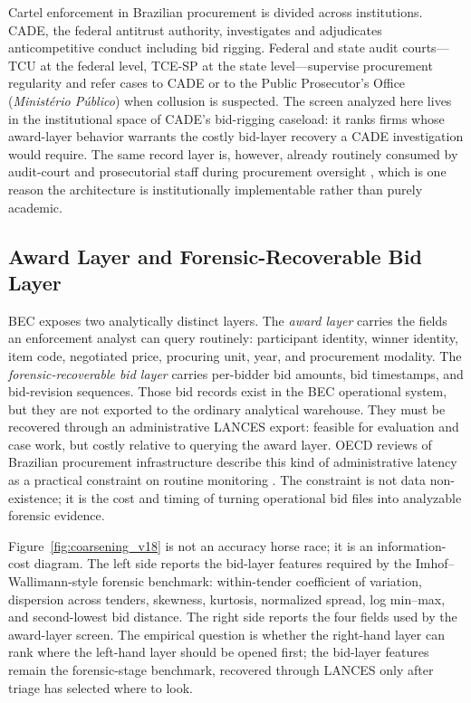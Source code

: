 Cartel enforcement in Brazilian procurement is divided across
institutions. CADE, the federal antitrust authority,
investigates and adjudicates anticompetitive conduct including
bid rigging. Federal and state audit courts---TCU at the federal
level, TCE-SP at the state level---supervise procurement
regularity and refer cases to CADE or to the Public
Prosecutor's Office (\emph{Ministério Público}) when collusion
is suspected. The screen analyzed here lives in the
institutional space of CADE's bid-rigging caseload: it ranks
firms whose award-layer behavior warrants the costly bid-layer
recovery a CADE investigation would require. The same record
layer is, however, already routinely consumed by audit-court and
prosecutorial staff during procurement oversight
\citep{oecd2019government}, which is one reason the architecture
is institutionally implementable rather than purely academic.

\subsection{Award Layer and Forensic-Recoverable Bid Layer}
\label{sec:setting_layers_two}

BEC exposes two analytically distinct layers. The
\emph{award layer} carries the fields an enforcement analyst can
query routinely: participant identity, winner identity, item
code, negotiated price, procuring unit, year, and procurement
modality. The \emph{forensic-recoverable bid layer} carries
per-bidder bid amounts, bid timestamps, and bid-revision
sequences. Those bid records exist in the BEC operational system,
but they are not exported to the ordinary analytical warehouse.
They must be recovered through an administrative LANCES export:
feasible for evaluation and case work, but costly relative to
querying the award layer. OECD reviews of Brazilian procurement
infrastructure describe this kind of administrative latency as a
practical constraint on routine monitoring
\citep{oecd2019government}. The constraint is not data
non-existence; it is the cost and timing of turning operational
bid files into analyzable forensic evidence.

Figure~\ref{fig:coarsening_v18} is not an accuracy horse race; it
is an information-cost diagram. The left side reports the
bid-layer features required by the Imhof--Wallimann-style forensic
benchmark: within-tender coefficient of variation, dispersion
across tenders, skewness, kurtosis, normalized spread, log
min--max, and second-lowest bid distance. The right side reports
the four fields used by the award-layer screen. The empirical
question is whether the right-hand layer can rank where the
left-hand layer should be opened first; the bid-layer features
remain the forensic-stage benchmark, recovered through LANCES
only after triage has selected where to look.

